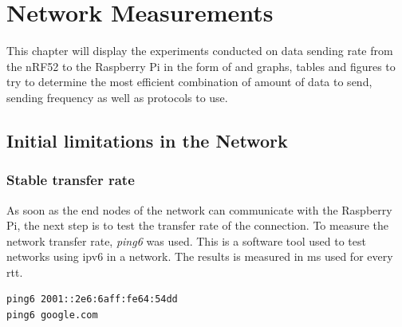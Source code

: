 \chapter{Network Measurements}
\label{chp:measurements2}


This chapter will display the experiments conducted on data sending rate from the nRF52 to the Raspberry Pi in the form of and graphs, tables and figures to try to determine the most efficient combination of amount of data to send, sending frequency as well as protocols to use. 




 

\section{Initial limitations in the Network}

\subsection{Stable transfer rate}

As soon as the end nodes of the network can communicate with the Raspberry Pi, the next step is to test the transfer rate of the connection. To measure the network transfer rate, \textit{ping6} was used. This is a software tool used to test networks using \gls{ipv6} in a network. The results is measured in ms used for every \gls{rtt}. 

\begin{verbatim}
ping6 2001::2e6:6aff:fe64:54dd
ping6 google.com
\end{verbatim}


